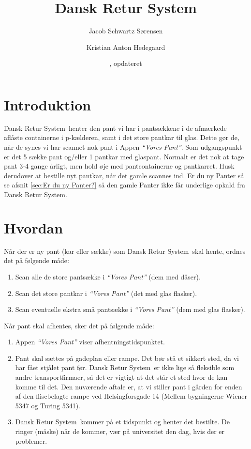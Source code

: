 

\title{Dansk Retur System}
\date{, opdateret }
\author{Jacob Schwartz Sørensen \and Kristian Anton Hedegaard}



\maketitle

\newcommand{\DRS}{Dansk Retur System}

\section{Introduktion}
\label{sec:Introduktion}

\DRS~henter den pant vi har i pantsækkene i de afmærkede aflåste containerne i p-kælderen, samt i det store pantkar til glas. Dette gør de, når de synes vi har scannet nok pant i Appen \emph{``Vores Pant''}. Som udgangspunkt er det 5 sække pant og/eller 1 pantkar med glaspant.
Normalt er det nok at tage pant 3-4 gange årligt, men hold øje med pantcontainerne og pantkarret. Husk derudover at bestille nyt pantkar, når det gamle scannes ind.
Er du ny Panter så se afsnit \ref{sec:Er du ny Panter?} så den gamle Panter ikke får underlige opkald fra \DRS.

\section{Hvordan}
\label{sec:Hvordan}

Når der er ny pant (kar eller sække) som \DRS~skal hente, ordnes det på følgende måde:

\begin{enumerate}
	\item Scan alle de store pantsække i \emph{``Vores Pant''} (dem med dåser).
	\item Scan det store pantkar i \emph{``Vores Pant''} (det med glas flasker).
	\item Scan eventuelle ekstra små pantsække i \emph{``Vores Pant''} (dem med glas flasker).
\end{enumerate}


Når pant skal afhentes, sker det på følgende måde:
\begin{enumerate}
	\item Appen \emph{``Vores Pant''} viser afhentningstidspunktet.
	\item Pant skal sættes på gadeplan eller rampe. Det bør stå et sikkert sted, da vi har fået stjålet pant før. \DRS~er ikke lige så fleksible som andre transportfirmaer, så det er vigtigt at det står et sted hvor de kan komme til det. Den nuværende aftale er, at vi stiller pant i gården for enden af den flisebelagte rampe ved Helsingforsgade 14 (Mellem bygningerne Wiener 5347 og Turing 5341).
	\item \DRS~kommer på et tidspunkt og henter det bestilte. De ringer (måske) når de kommer, vær på universitet den dag, hvis der er problemer.
\end{enumerate}

